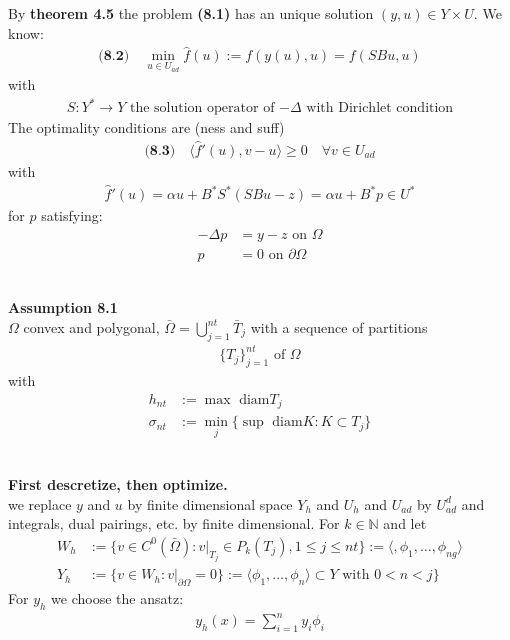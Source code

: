 \documentclass[a4paper,11pt,fleqn]{book}
\theoremstyle{definition}
\theoremstyle{remark}
\begin{document}
By \textbf{theorem 4.5} the problem \textbf{(8.1)} has an unique solution $(y, u) \in Y \times U$. We know:
\begin{align*} \textbf{(8.2)} \quad
	\min_{u \in U_{ad}} \hat{f}(u) := f(y(u), u) = f(SBu, u) 
\end{align*}
with 
\begin{align*}
	S: Y^* \rightarrow Y \text{ the solution operator of $-\Delta$ with Dirichlet condition}
\end{align*}
The optimality conditions are (ness and suff)
\begin{align*}
\textbf{(8.3)} \quad
	\langle \hat{f}'(u), v - u \rangle \geq 0 \quad \forall v \in U_{ad}
\end{align*}
with 
\begin{align*}
	\hat{f}'(u) = \alpha u + B^* S^* (S B u - z) = \alpha u + B^* p \in U^*
\end{align*}
for $p$ satisfying:
\begin{align*}
	- \Delta p &= y - z \text{ on } \Omega\\
	p &= 0 \text{ on } \partial \Omega
\end{align*}

\quad\\
\textbf{Assumption 8.1}\\
$\Omega$ convex and polygonal, $\bar{\Omega} = \bigcup_{j = 1}^{nt} \bar{T}_j $ with a sequence of partitions
\begin{align*}
	\{T_j\}_{j =1}^{nt} \text{ of $\Omega$}
\end{align*}
with
\begin{align*}
	h_{nt}&:= \max \text{ diam} T_j\\
	\sigma_{nt}&:= \min_j \{ \sup \text{ diam} K : K \subset T_j\}
\end{align*}

\qquad\\
\textbf{First descretize, then optimize.}\\
we replace $y$ and $u$ by finite dimensional space $Y_h$ and $U_h$ and $U_{ad}$ by $U_{ad}^d$ and integrals, dual pairings, etc. by finite dimensional. For $k \in \mathbb{N}$ and let 
\begin{align*}
	W_h &:= \{ v \in C^0(\bar{\Omega}): v|_{T_j} \in P_k(T_j), 1 \le j \le nt\} := \langle, \phi_1, \dots, \phi_{ng}\rangle\\
	Y_h &:= \{ v \in W_h: v|_{\partial\Omega} = 0 \} := \langle \phi_1, \dots, \phi_n \rangle \subset Y \text{ with } 0 < n < j\}
\end{align*}
For $y_h$ we choose the ansatz:
\begin{align*}
	y_h(x) = \sum_{i = 1}^n y_i \phi_i
\end{align*}
\end{document}
